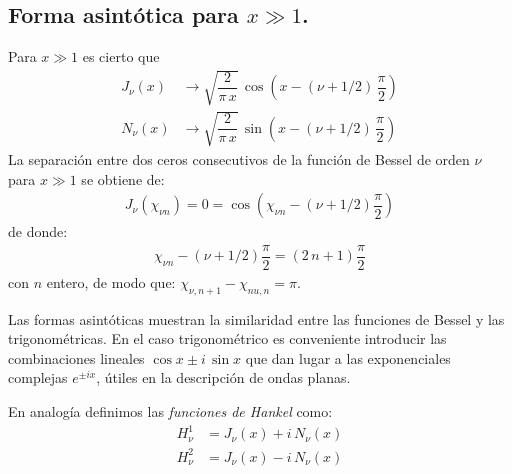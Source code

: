 \subsection{Forma asintótica para $x \gg 1$.}
Para $x \gg 1$ es cierto que
\begin{align*}
J_{\nu} (x) &\to \sqrt{\dfrac{2}{\pi \, x}} \, \cos \left( x - (\nu + 1/2) \, \dfrac{\pi}{2} \right) \\
N_{\nu} (x) &\to \sqrt{\dfrac{2}{\pi \, x}} \, \sin \left( x - (\nu + 1/2) \, \dfrac{\pi}{2} \right)
\end{align*}
La separación entre dos ceros consecutivos de la función de Bessel de orden $\nu$ para $x \gg 1$ se obtiene de:
\begin{align*}
J_{\nu}(\chi_{\nu n}) = 0 = \cos (\chi_{\nu n} - (\nu + 1/2) \dfrac{\pi}{2})
\end{align*}
de donde:
\begin{align*}
\chi_{\nu n} - (\nu +  1/2) \dfrac{\pi}{2} = (2 \, n + 1) \dfrac{\pi}{2}
\end{align*}
con $n$ entero, de modo que: $\chi_{\nu, n+1} - \chi_{nu,n} = \pi$.
\par
Las formas asintóticas muestran la similaridad entre las funciones de Bessel y las trigonométricas. En el caso trigonométrico es conveniente introducir las combinaciones lineales $\cos x \pm i \, \sin x$ que dan lugar a las exponenciales complejas $e^{\pm i x}$, útiles en la descripción de ondas planas. 
\par
En analogía  definimos las \emph{funciones de Hankel} como:
\begin{align*}
H_{\nu}^{1} &= J_{\nu} (x) + i \, N_{\nu} (x) \\
H_{\nu}^{2} &= J_{\nu} (x) - i \, N_{\nu} (x)  
\end{align*}
